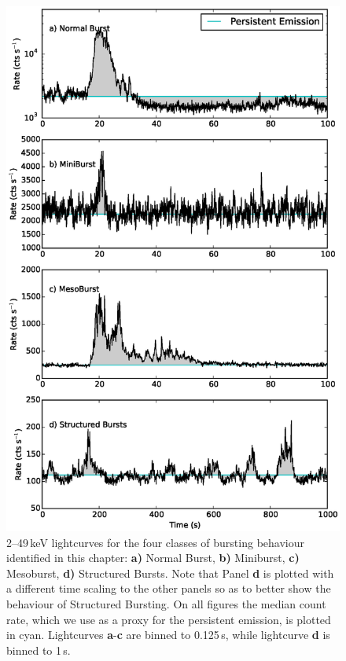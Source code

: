 \begin{figure}
  \centering
  \includegraphics[width=.9\linewidth, trim={0.7cm 0.1cm 1.5cm 1.4cm},clip]{images/comp_bursts.eps}
  \caption[Lightcurves for the four classes of bursting behaviour identified in the Bursting Pulsar.]{\small 2--49\,keV lightcurves for the four classes of bursting behaviour identified in this chapter: \textbf{a)} Normal Burst, \textbf{b)} Miniburst, \textbf{c)} Mesoburst, \textbf{d)} Structured Bursts.  Note that Panel \textbf{d} is plotted with a different time scaling to the other panels so as to better show the behaviour of Structured Bursting.  On all figures the median count rate, which we use as a proxy for the persistent emission, is plotted in cyan.  Lightcurves \textbf{a}-\textbf{c} are binned to 0.125\,s, while lightcurve \textbf{d} is binned to 1\,s.}
  \label{fig:classes}
\end{figure}

